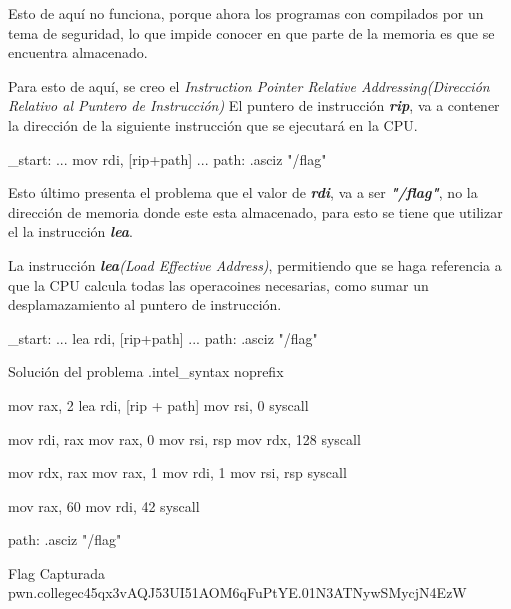 Esto de aquí no funciona, porque ahora los programas con compilados por un tema
de seguridad, lo que impide conocer en que parte de la memoria es que se
encuentra almacenado.

Para esto de aquí, se creo el
\textit{Instruction Pointer Relative Addressing(Dirección Relativo al Puntero de Instrucción)}
El puntero de instrucción \textbf{\textit{rip}}, va a contener la dirección
de la siguiente instrucción que se ejecutará en la CPU.

\begin{codebox}[ASM]{}
	_start:
	...
	mov rdi, [rip+path]
	...
	path:
	.asciz "/flag"
\end{codebox}

Esto último presenta el problema que el valor de \textbf{\textit{rdi}}, va a ser \textbf{\textit{"/flag"}},
no la dirección de memoria donde este esta almacenado, para esto se
tiene que utilizar el la instrucción \textbf{\textit{lea}}.

La instrucción \textbf{\textit{lea}}\textit{(Load Effective Address)}, permitiendo
que se haga referencia a que la CPU calcula todas las operacoines necesarias,
como sumar un desplamazamiento al puntero de instrucción.

\begin{codebox}[ASM]{}
	_start:
	...
	lea rdi, [rip+path]
	...
	path:
	.asciz "/flag"
\end{codebox}

\begin{codebox}[ASM]{Solución del problema}
	.intel_syntax noprefix

	mov rax, 2
	lea rdi, [rip + path]
	mov rsi, 0
	syscall

	mov rdi, rax
	mov rax, 0
	mov rsi, rsp
	mov rdx, 128
	syscall

	mov rdx, rax
	mov rax, 1
	mov rdi, 1
	mov rsi, rsp
	syscall

	mov rax, 60
	mov rdi, 42
	syscall

	path:
	.asciz "/flag"
\end{codebox}

\begin{flagbox}{Flag Capturada}
	pwn.college{c45qx3vAQJ53UI51AOM6qFuPtYE.01N3ATNywSMycjN4EzW}
\end{flagbox}
